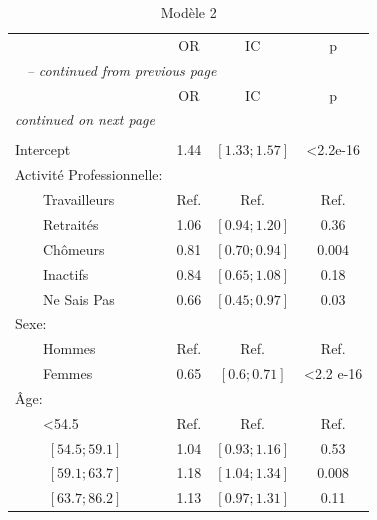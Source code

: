 \documentclass{book}
\begin{document}
\begin{longtable}{lccc}\caption{Modèle 2}\\
    \hline  
		& \multirow{2}{*}{OR} & \multirow{2}{*}{IC}& \multirow{2}{*}{p}\\ 
		 &    				    &    			    &                  \\ 
   \hline
    \hline     
    \endfirsthead 
    \multicolumn{4}{l}{\tablename\ \thetable{} \textit{-- continued from previous page}}\\ 
    \hline
		& \multirow{2}{*}{OR} & \multirow{2}{*}{IC}& \multirow{2}{*}{p}\\ 
		&    				    &    			    &                  \\ 
    \hline
    \hline  
    \endhead   
    \hline
    \multicolumn{4}{l}{\textit{continued on next page}} \\ 
    \endfoot   
    \multicolumn{4}{l}{}  \\ 
    \endlastfoot  
Intercept & 1.44 & $\left[1.33 ; 1.57 \right]$ & <2.2e-16\\
Activité Professionnelle: &              &              &	\\ 
$\qquad$Travailleurs 		&		Ref.		& 	Ref.		&	Ref.\\ 
$\qquad$Retraités&1.06 &$\left[0.94 ; 1.20 \right]$ & 0.36\\ 
$\qquad$Chômeurs & 0.81& $\left[0.70 ; 0.94\right]$& 0.004\\ 
$\qquad$Inactifs  & 0.84& $\left[0.65 ; 1.08\right]$& 0.18\\ 
$\qquad$Ne Sais Pas & 0.66& $\left[0.45 ; 0.97\right]$ & 0.03 \\ 
Sexe: &              &              &                          \\ 
$\qquad$Hommes &Ref. & Ref.& Ref.\\ 
$\qquad$Femmes & 0.65& $\left[0.6 ; 0.71 \right]$ & <2.2 e-16\\
Âge: &&&\\
$\qquad$<54.5 &Ref.&Ref.&Ref.\\
$\qquad$ $\left[54.5 ; 59.1 \right]$ &1.04& $\left[0.93 ; 1.16 \right]$& 0.53\\
$\qquad$ $\left[59.1 ; 63.7\right]$ &1.18&$\left[1.04 ; 1.34 \right]$& 0.008\\
$\qquad$ $\left[63.7 ; 86.2 \right]$&1.13&$\left[0.97 ; 1.31 \right]$&0.11\\
 
    \hline
    \end{longtable} 
\end{document}
